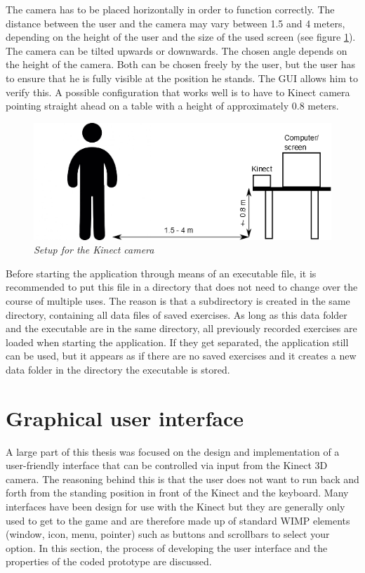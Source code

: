 The camera has to be placed horizontally in order to function correctly. The distance between the user and the camera may vary between 1.5 and 4 meters, depending on the height of the user and the size of the used screen (see figure \ref{fig: kinect_setup}). The camera can be tilted upwards or downwards. The chosen angle depends on the height of the camera. Both can be chosen freely by the user, but the user has to ensure that he is fully visible at the position he stands. The GUI allows him to verify this. A possible configuration that works well is to have to Kinect camera pointing straight ahead on a table with a height of approximately 0.8 meters.\\

\begin{figure}[H]
\begin{center}
\includegraphics[width=12cm]{SetupKinect.png}
\caption{\emph{Setup for the Kinect camera}}
\label{fig: kinect_setup}
\end{center}
\end{figure}

Before starting the application through means of an executable file, it is recommended to put this file in a directory that does not need to change over the course of multiple uses. The reason is that a subdirectory is created in the same directory, containing all data files of saved exercises. As long as this data folder and the executable are in the same directory, all previously recorded exercises are loaded when starting the application. If they get separated, the application still can be used, but it appears as if there are no saved exercises and it creates a new data folder in the directory the executable is stored.\\


\section{Graphical user interface}

A large part of this thesis was focused on the design and implementation of a user-friendly interface that can be controlled via input from the Kinect 3D camera. The reasoning behind this is that the user does not want to run back and forth from the standing position in front of the Kinect and the keyboard. Many interfaces have been design for use with the Kinect but they are generally only used to get to the game and are therefore made up of standard WIMP elements (window, icon, menu, pointer) such as buttons and scrollbars to select your option. In this section, the process of developing the user interface and the properties of the coded prototype are discussed.\\

